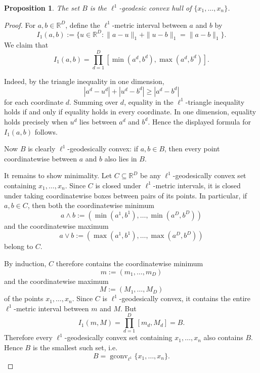 \documentclass[11pt]{article}
\newtheorem{proposition}{Proposition}
\begin{document}
\begin{proposition}
\label{prop:l1-geodesic-box-hull}
The set \(B\) is the \(\ell^1\)-geodesic convex hull of
\(\{x_1,\dots,x_n\}\).
\end{proposition}

\begin{proof}
For \(a,b\in \mathbb{R}^D\), define the \(\ell^1\)-metric interval between
\(a\) and \(b\) by
\[
I_1(a,b)
:=
\{u\in\mathbb{R}^D:
\|a-u\|_1+\|u-b\|_1=\|a-b\|_1\}.
\]
We claim that
\[
I_1(a,b)
=
\prod_{d=1}^D
[\min(a^d,b^d),\max(a^d,b^d)].
\]

Indeed, by the triangle inequality in one dimension,
\[
|a^d-u^d|+|u^d-b^d|\ge |a^d-b^d|
\]
for each coordinate \(d\). Summing over \(d\), equality in the
\(\ell^1\)-triangle inequality holds if and only if equality holds in every
coordinate. In one dimension, equality holds precisely when \(u^d\) lies
between \(a^d\) and \(b^d\). Hence the displayed formula for \(I_1(a,b)\)
follows.

Now \(B\) is clearly \(\ell^1\)-geodesically convex: if \(a,b\in B\), then
every point coordinatewise between \(a\) and \(b\) also lies in \(B\).

It remains to show minimality. Let \(C\subseteq \mathbb{R}^D\) be any
\(\ell^1\)-geodesically convex set containing \(x_1,\dots,x_n\). Since
\(C\) is closed under \(\ell^1\)-metric intervals, it is closed under taking
coordinatewise boxes between pairs of its points. In particular, if
\(a,b\in C\), then both the coordinatewise minimum
\[
a\wedge b
:=
(\min(a^1,b^1),\dots,\min(a^D,b^D))
\]
and the coordinatewise maximum
\[
a\vee b
:=
(\max(a^1,b^1),\dots,\max(a^D,b^D))
\]
belong to \(C\).

By induction, \(C\) therefore contains the coordinatewise minimum
\[
m:=(m_1,\dots,m_D)
\]
and the coordinatewise maximum
\[
M:=(M_1,\dots,M_D)
\]
of the points \(x_1,\dots,x_n\). Since \(C\) is \(\ell^1\)-geodesically
convex, it contains the entire \(\ell^1\)-metric interval between \(m\) and
\(M\). But
\[
I_1(m,M)
=
\prod_{d=1}^D [m_d,M_d]
=
B.
\]
Therefore every \(\ell^1\)-geodesically convex set containing
\(x_1,\dots,x_n\) also contains \(B\). Hence \(B\) is the smallest such set,
i.e.
\[
B=\operatorname{gconv}_{\ell^1}\{x_1,\dots,x_n\}.
\]
\end{proof}
\end{document}
